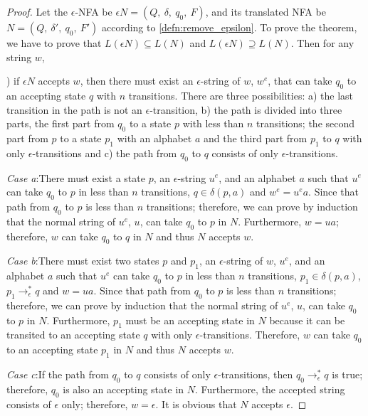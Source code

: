 \begin{proof}
\noindent Let the \(\epsilon\)-NFA be \(\epsilon N = (Q,\ \delta,\ q_0,\
F)\), and its translated NFA be \(N = (Q,\ \delta',\ q_0,\ F')\)
according to \autoref{defn:remove_epsilon}. To
prove the theorem, we have to prove that \(L(\epsilon N) \subseteq
L(N)\) and \(L(\epsilon N) \supseteq L(N)\). Then for any string \(w\), 

\par {}) if \(\epsilon N\) accepts \(w\), then there must exist an
\(\epsilon\)-string of \(w\), \(w^e\), that can take \(q_0\) to an
accepting state \(q\) with \(n\) transitions. There are three
possibilities: a) the last transition in the path is not an
\(\epsilon\)-transition, b) the path is divided into three parts, the
first part from \(q_0\) to a state \(p\) with less than \(n\)
transitions; the second part from \(p\) to a state \(p_1\) with an
alphabet \(a\) and the third part from \(p_1\) to \(q\) with only
\(\epsilon\)-transitions and c) the path from \(q_0\)
to \(q\) consists of only \(\epsilon\)-transitions.

\par \textit{Case a}:\quad There must exist a state \(p\), an
\(\epsilon\)-string \(u^e\), and an alphabet \(a\) such that \(u^e\)
can take \(q_0\) to \(p\) in less than \(n\) transitions, \(q \in
\delta(p,a)\) and \(w^e = u^ea\). Since that path from \(q_0\) to
\(p\) is less than \(n\) transitions; therefore, we can prove by
induction that the normal string of \(u^e\), \(u\), can take
\(q_0\) to \(p\) in \(N\). Furthermore, \(w = ua\); therefore, \(w\) can
take \(q_0\) to \(q\) in \(N\) and thus \(N\) accepts \(w\). 

\par \textit{Case b}:\quad There must exist two states \(p\) and \(p_1\), an
\(\epsilon\)-string of \(w\), \(u^e\), and an alphabet \(a\) such
that \(u^e\) can take \(q_0\) to \(p\) in less than \(n\) transitions,
\(p_1 \in \delta(p,a)\), \(p_1 \to_\epsilon^* q\) and \(w = ua\). Since that path from \(q_0\) to
\(p\) is less than \(n\) transitions; therefore, we can prove by
induction that the normal string of \(u^e\), \(u\), can take
\(q_0\) to \(p\) in \(N\). Furthermore, \(p_1\) must be an accepting state in \(N\)
because it can be transited to an accepting state \(q\) with only
\(\epsilon\)-transitions. Therefore, \(w\) can take \(q_0\) to an
accepting state \(p_1\) in \(N\) and thus \(N\) accepts \(w\). 

\par \textit{Case c}:\quad If the path from \(q_0\)
to \(q\) consists of only \(\epsilon\)-transitions, then \(q_0
\to_\epsilon^* q\) is true; therefore, \(q_0\) is also an accepting
state in \(N\). Furthermore, the accepted string consists of \(\epsilon\) only;
therefore, \(w = \epsilon\). It is obvious that \(N\) accepts \(\epsilon\). 


\end{proof}
